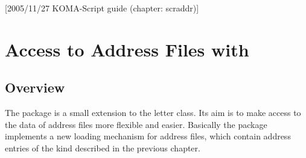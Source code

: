 %
%
%
%
%
%
%
%
% 
%
%
%
%

[2005/11/27 KOMA-Script guide (chapter: scraddr)]

\chapter{Access to Address Files with }%
%

\section{Overview}\label{sec:scraddr.overview}
The package  is a small extension to
the \KOMAScript{} letter class.
Its aim is to make access to the data of address files
more flexible and easier.
Basically the package implements a new loading mechanism
for address files, which contain address entries of the kind
described in the previous chapter.

